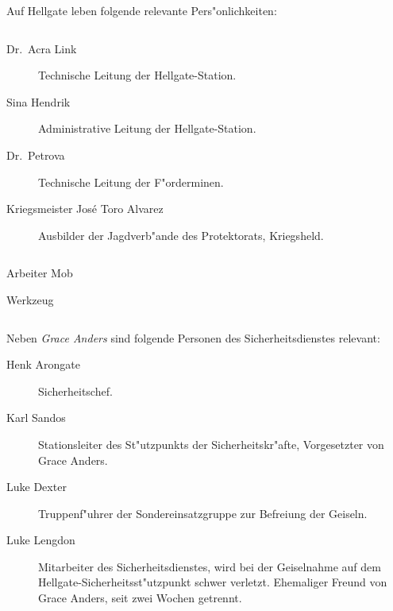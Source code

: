 
Auf Hellgate leben folgende relevante Pers"onlichkeiten:

\begin{column}[l]{0.45}
    \begin{description}
        \item[Dr.~Acra Link] Technische Leitung der Hellgate-Station.
        \item[Sina Hendrik] Administrative Leitung der Hellgate-Station.
        \item[Dr.~Petrova] Technische Leitung der F"orderminen.
        \item[Kriegsmeister Jos\'{e} \frqq{}Toro\flqq{} Alvarez] Ausbilder der Jagdverb"ande des Protektorats, Kriegsheld.
    \end{description}
\end{column}
\begin{column}[r]{0.45}
    \begin{nscsheet}[h]{Arbeiter Mob}
        \nscstats[]
        \nscruler
        \begin{nscinventory}
            \nscitem[Waffen] Werkzeug
        \end{nscinventory}
    \end{nscsheet}
\end{column}


Neben \emph{Grace Anders} sind folgende Personen des Sicherheitsdienstes relevant:

\begin{description}
    \item[Henk Arongate] Sicherheitschef.
    \item[Karl Sandos] Stationsleiter des St"utzpunkts der Sicherheitskr"afte, Vorgesetzter von Grace Anders.
    \item[Luke Dexter] Truppenf"uhrer der Sondereinsatzgruppe zur Befreiung der Geiseln.
    \item[Luke Lengdon] Mitarbeiter des Sicherheitsdienstes, wird bei der Geiselnahme auf dem Hellgate-Sicherheitsst"utzpunkt schwer 
        verletzt. Ehemaliger Freund von Grace Anders, seit zwei Wochen getrennt.
\end{description}

\vfill\pagebreak
